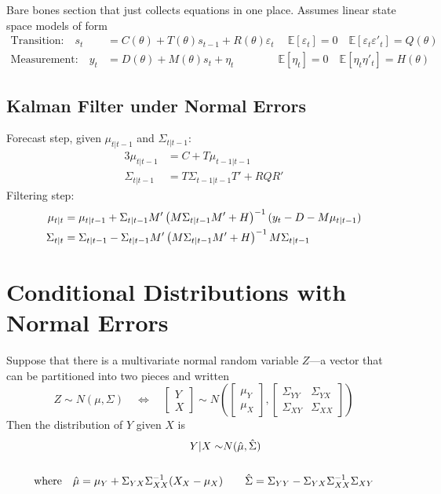 \documentclass[a4paper,12pt]{article}
\begin{document}
Bare bones section that just collects equations in one place. Assumes
linear state space models of form
\begin{align}
  \text{Transition:} \quad
    s_{t} &= C(\theta) + T(\theta) s_{t-1}
    + R(\theta)\varepsilon_{t}\
    \quad \mathbb{E}[\varepsilon_t] = 0
    \quad \mathbb{E}[\varepsilon_t \varepsilon'_t] =  Q(\theta) \\
  \text{Measurement:} \quad
    y_{t} &= D(\theta) + M(\theta) s_{t} + \eta_{t}
    \qquad\qquad \mathbb{E}[\eta_t] =  0
    \quad \mathbb{E}[\eta_t \eta'_t] =  H(\theta)
\end{align}


\subsection{Kalman Filter under Normal Errors}

Forecast step, given $\mu_{t|t-1}$ and $\Sigma_{t|t-1}$:
\begin{alignat*}{3}
  \mu_{t|t-1} &= C + T\mu_{t-1|t-1} \\
  \Sigma_{t|t-1} &= T\Sigma_{t-1|t-1}T' + RQR'
\end{alignat*}
Filtering step:
\begin{alignat}{3}
  \mu_{t|t}
    &= \mu_{t|t-1} + \Sigma_{t|t-1} M'
    \left(M\Sigma_{t|t-1}M' + H\right)^{-1} (y_t-D-M\mu_{t|t-1}) \notag\\
  \Sigma_{t|t}
    &= \Sigma_{t|t-1} - \Sigma_{t|t-1}M'
    \left(M\Sigma_{t|t-1}M' + H\right)^{-1} M\Sigma_{t|t-1} \notag
\end{alignat}


%
\clearpage
\appendix


\section{Conditional Distributions with Normal Errors}
\label{sec:mvncond}

Suppose that there is a multivariate normal random variable $Z$---a
vector that can be partitioned into two pieces and written
\[
  Z \sim N(\mu, \Sigma) \quad\Leftrightarrow\quad
  \begin{bmatrix} Y \\ X \end{bmatrix}
  \sim
  N\left(\begin{bmatrix} \mu_Y \\ \mu_X \end{bmatrix},
  \begin{bmatrix} \Sigma_{YY} & \Sigma_{YX} \\
  \Sigma_{XY} & \Sigma_{XX} \end{bmatrix}
  \right)
\]
Then the distribution of $Y$ given $X$ is
\begin{align}
  Y | X \sim &N(\hat{\mu}, \hat{\Sigma})  \notag\\
  \label{reg} \\
  \text{where} \quad
  \hat{\mu} = \mu_Y + \Sigma_{YX} \Sigma^{-1}_{XX}
  (X_X-\mu_X)  & \quad \quad
  \hat{\Sigma} = \Sigma_{YY} - \Sigma_{YX} \Sigma^{-1}_{XX}
    \Sigma_{XY}
  \notag
\end{align}
\end{document}
